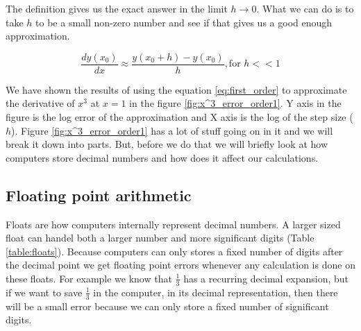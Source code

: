 The definition gives us the exact answer in the limit $h \to 0$. What we can do is to take $h$ to be a small non-zero number and see if that gives us a good enough approximation.

\begin{equation}
    \frac{dy(x_0)}{dx} \approx \frac{y(x_0 + h) - y(x_0)}{h} , \text{for } h << 1
    \label{eq:first_order}
\end{equation}

We have shown the results of using the equation \ref{eq:first_order} to approximate the derivative of $x^3$ at $x=1$ in the figure \ref{fig:x^3_error_order1}. Y axis in the figure is the log error of the approximation and X axis is the log of the  step size ($h$). Figure \ref{fig:x^3_error_order1} has a lot of stuff going on in it and we will break it down into parts. But, before we do that we will briefly look at how computers store decimal numbers and how does it affect our calculations.

\subsection{Floating point arithmetic}

 Floats are how computers internally represent decimal numbers. A larger sized float can handel both a larger number and more significant digits (Table \ref{table:floats}). Because computers can only stores a fixed number of digits after the decimal point we get  floating point errors whenever any calculation is done on these floats. For example we know that $\frac{1}{3}$ has a recurring decimal expansion, but if we want to save $\frac{1}{3}$ in the computer, in its decimal representation, then there will be a small error because we can only store a fixed number of significant digits.




